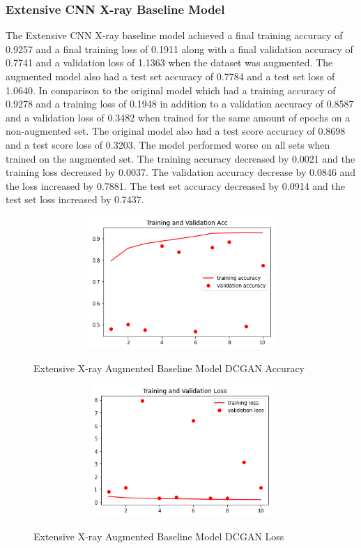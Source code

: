 \subsubsection{Extensive CNN X-ray Baseline Model}
The Extensive CNN X-ray baseline model achieved a final training accuracy of 0.9257 and a final training loss of 0.1911 along with a final validation accuracy of 0.7741 and a validation loss of 1.1363 when the dataset was augmented. The augmented model also had a test set accuracy of 0.7784 and a test set loss of 1.0640.  In comparison to the original model which had a training accuracy of 0.9278 and a training loss of 0.1948 in addition to a validation accuracy of 0.8587 and a validation loss of 0.3482  when trained for the same amount of epochs on a non-augmented set.  The original model also had a test score accuracy of 0.8698 and a test score loss of 0.3203.  The model performed worse on all sets when trained on the augmented set.  The training accuracy decreased by 0.0021 and the training loss decreased by 0.0037. The validation accuracy decrease by 0.0846 and the loss increased by 0.7881.  The test set accuracy decreased by 0.0914 and the test set loss increased by 0.7437.
 \begin{figure}[H]
    \centering    \includegraphics[width=1\textwidth,height=5cm,keepaspectratio]{Images/BaselineTrainingValidationAccuracyExtensiveXRayAugmentedDCGAN.png}\\
    \caption{Extensive X-ray Augmented Baseline Model DCGAN Accuracy}
    \label{fig:Extensive X-ray Augmented Baseline Model DCGAN Accuracy}
\end{figure}
 \begin{figure}[H]
    \centering
    \includegraphics[width=1\textwidth,height=5cm,keepaspectratio]{Images/BaselineTrainingValidationLossExtensiveXRayAugmentedDCGAN.png}\\
    \caption{Extensive X-ray Augmented Baseline Model DCGAN Loss}
    \label{fig:Extensive X-ray Baseline Model DCGAN Loss}
\end{figure}


